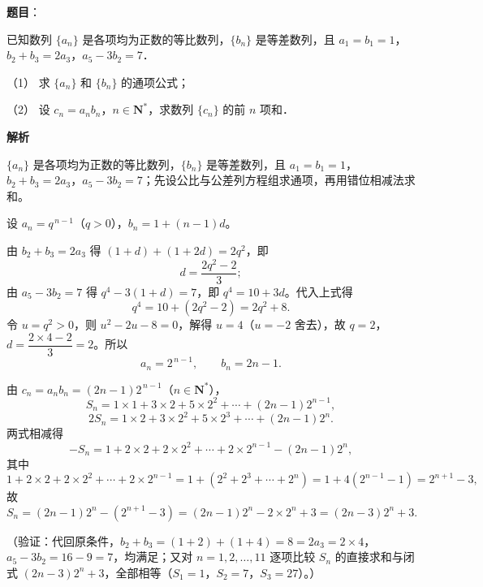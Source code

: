 \begin{answer}

\textbf{题目}：

已知数列 \(\{a_n\}\) 是各项均为正数的等比数列，\(\{b_n\}\) 是等差数列，且 \(a_1=b_1=1\)，\(b_2+b_3=2a_3\)，\(a_5-3b_2=7\)．

（1） 求 \(\{a_n\}\) 和 \(\{b_n\}\) 的通项公式；

（2） 设 \(c_n=a_nb_n\)，\(n\in\mathbf{N}^*\)，求数列 \(\{c_n\}\) 的前 \(n\) 项和．

\textbf{解析}

\(\{a_n\}\) 是各项均为正数的等比数列，\(\{b_n\}\) 是等差数列，且 \(a_1=b_1=1\)，\(b_2+b_3=2a_3\)，\(a_5-3b_2=7\)；先设公比与公差列方程组求通项，再用错位相减法求和。

设 \(a_n=q^{\,n-1}\)（\(q>0\)），\(b_n=1+(n-1)d\)。

由 \(b_2+b_3=2a_3\) 得 \((1+d)+(1+2d)=2q^{2}\)，即
\nopagebreak[4]
\[
d=\dfrac{2q^{2}-2}{3};
\]
由 \(a_5-3b_2=7\) 得 \(q^{4}-3(1+d)=7\)，即 \(q^{4}=10+3d\)。代入上式得
\nopagebreak[4]
\[
q^{4}=10+(2q^{2}-2)=2q^{2}+8.
\]
令 \(u=q^{2}>0\)，则 \(u^{2}-2u-8=0\)，解得 \(u=4\)（\(u=-2\) 舍去），故 \(q=2\)，\(d=\dfrac{2\times4-2}{3}=2\)。所以
\nopagebreak[4]
\[
a_n=2^{\,n-1},\qquad b_n=2n-1.
\]

由 \(c_n=a_nb_n=(2n-1)2^{\,n-1}\)（\(n\in\mathbf{N}^*\)），
\nopagebreak[4]
\[
S_n=1\times1+3\times2+5\times2^{2}+\cdots+(2n-1)2^{n-1},
\]
\nopagebreak[4]
\[
2S_n=1\times2+3\times2^{2}+5\times2^{3}+\cdots+(2n-1)2^{n}.
\]
两式相减得
\nopagebreak[4]
\[
-S_n=1+2\times2+2\times2^{2}+\cdots+2\times2^{n-1}-(2n-1)2^{n},
\]
其中
\nopagebreak[4]
\[
1+2\times2+2\times2^{2}+\cdots+2\times2^{n-1}=1+(2^{2}+2^{3}+\cdots+2^{n})=1+4(2^{n-1}-1)=2^{n+1}-3,
\]
故
\nopagebreak[4]
\[
S_n=(2n-1)2^{n}-(2^{n+1}-3)=(2n-1)2^{n}-2\times2^{n}+3=(2n-3)2^{n}+3.
\]

（验证：代回原条件，\(b_2+b_3=(1+2)+(1+4)=8=2a_3=2\times4\)，\(a_5-3b_2=16-9=7\)，均满足；又对 \(n=1,2,\dots,11\) 逐项比较 \(S_n\) 的直接求和与闭式 \((2n-3)2^{n}+3\)，全部相等（\(S_1=1\)，\(S_2=7\)，\(S_3=27\)）。）



\end{answer}

